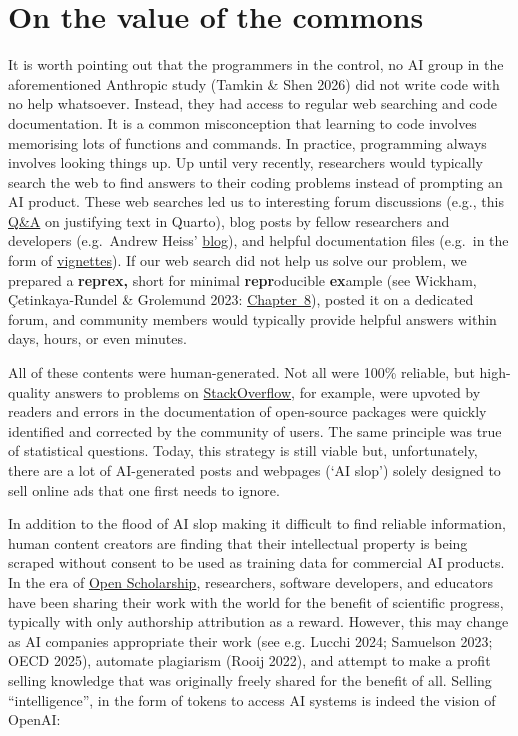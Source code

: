 \documentclass[
  letterpaper,
  DIV=11,
  numbers=noendperiod]{scrreprt}
\begin{document}
\section{On the value of the commons}\label{on-the-value-of-the-commons}

It is worth pointing out that the programmers in the control, no AI
group in the aforementioned Anthropic study (Tamkin \& Shen 2026) did
not write code with no help whatsoever. Instead, they had access to
regular web searching and code documentation. It is a common
misconception that learning to code involves memorising lots of
functions and commands. In practice, programming always involves looking
things up. Up until very recently, researchers would typically search
the web to find answers to their coding problems instead of prompting an
AI product. These web searches led us to interesting forum discussions
(e.g., this
\href{https://stackoverflow.com/questions/74336124/how-to-justify-text-in-quarto}{Q\&A}
on justifying text in Quarto), blog posts by fellow researchers and
developers (e.g.~Andrew Heiss'
\href{https://www.andrewheiss.com/blog/}{blog}), and helpful
documentation files (e.g.~in the form of
\href{https://r-pkgs.org/vignettes.html}{vignettes}). If our web search
did not help us solve our problem, we prepared a \textbf{reprex,} short
for minimal \textbf{repr}oducible \textbf{ex}ample (see Wickham,
Çetinkaya-Rundel \& Grolemund 2023:
\href{https://r4ds.hadley.nz/workflow-help.html}{Chapter~8}), posted it
on a dedicated forum, and community members would typically provide
helpful answers within days, hours, or even minutes.

All of these contents were human-generated. Not all were 100\% reliable,
but high-quality answers to problems on
\href{https://stackoverflow.com/questions}{StackOverflow}, for example,
were upvoted by readers and errors in the documentation of open-source
packages were quickly identified and corrected by the community of
users. The same principle was true of statistical questions. Today, this
strategy is still viable but, unfortunately, there are a lot of
AI-generated posts and webpages (`AI slop') solely designed to sell
online ads that one first needs to ignore.

In addition to the flood of AI slop making it difficult to find reliable
information, human content creators are finding that their intellectual
property is being scraped without consent to be used as training data
for commercial AI products. In the era of
\hyperref[sec-OpenScholarship]{Open Scholarship}, researchers, software
developers, and educators have been sharing their work with the world
for the benefit of scientific progress, typically with only authorship
attribution as a reward. However, this may change as AI companies
appropriate their work (see e.g. Lucchi 2024; Samuelson 2023; OECD
2025), automate plagiarism (Rooij 2022), and attempt to make a profit
selling knowledge that was originally freely shared for the benefit of
all. Selling ``intelligence'', in the form of tokens to access AI
systems is indeed the vision of OpenAI:
\end{document}
